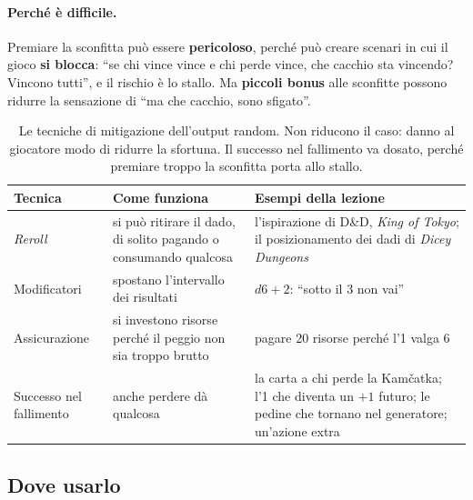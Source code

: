 \paragraph{Perché è difficile.} Premiare la sconfitta può essere \textbf{pericoloso}, perché
può creare scenari in cui il gioco \textbf{si blocca}: ``se chi vince vince e chi perde vince,
che cacchio sta vincendo? Vincono tutti'', e il rischio è lo stallo. Ma \textbf{piccoli bonus}
alle sconfitte possono ridurre la sensazione di ``ma che cacchio, sono sfigato''.

\begin{table}[htbp]
\centering
\small
\begin{tabular}{@{}>{\raggedright\arraybackslash}p{3.0cm}>{\raggedright\arraybackslash}p{5.4cm}>{\raggedright\arraybackslash}p{5.2cm}@{}}
\toprule
\textbf{Tecnica} & \textbf{Come funziona} & \textbf{Esempi della lezione} \\
\midrule
\emph{Reroll} & si può ritirare il dado, di solito pagando o consumando qualcosa &
  l'ispirazione di D\&D, \emph{King of Tokyo}; il posizionamento dei dadi di \emph{Dicey
  Dungeons} \\
\addlinespace
Modificatori & spostano l'intervallo dei risultati & $d6+2$: ``sotto il 3 non vai'' \\
\addlinespace
Assicurazione & si investono risorse perché il peggio non sia troppo brutto & pagare 20
  risorse perché l'1 valga 6 \\
\addlinespace
Successo nel fallimento & anche perdere dà qualcosa & la carta a chi perde la Kamčatka; l'1
  che diventa un $+1$ futuro; le pedine che tornano nel generatore; un'azione extra \\
\bottomrule
\end{tabular}
\caption{Le tecniche di mitigazione dell'output random. Non riducono il caso: danno al
giocatore modo di ridurre la sfortuna. Il successo nel fallimento va dosato, perché premiare
troppo la sconfitta porta allo stallo.}
\label{a15:tab:mitigazione}
\end{table}

\subsection{Dove usarlo}

